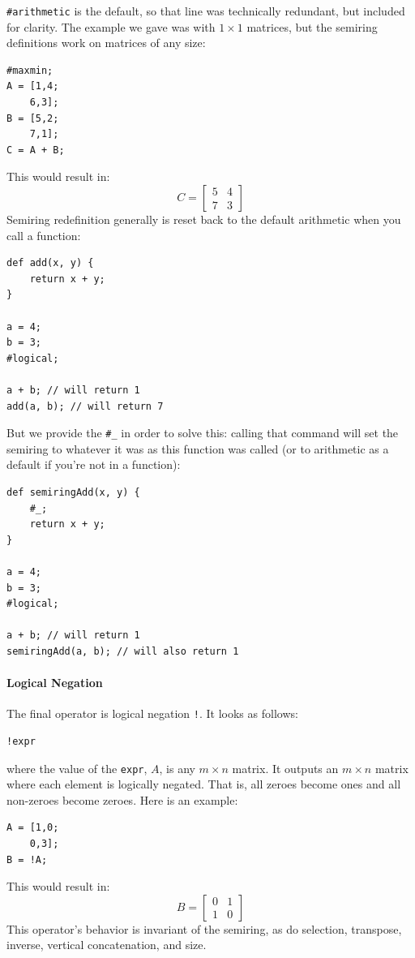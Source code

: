 \verb=#arithmetic= is the default, so that line was technically redundant, but included for clarity.
The example we gave was with $1\times1$ matrices, but the semiring definitions work on matrices of any size:

\begin{lstlisting}
#maxmin;
A = [1,4;
    6,3];
B = [5,2;
    7,1];
C = A + B;
\end{lstlisting}
This would result in:
$$C=\begin{bmatrix}
5&4\\
7&3
\end{bmatrix}$$
Semiring redefinition generally is reset back to the default arithmetic when you call a function:
\begin{lstlisting}
def add(x, y) {
    return x + y;
}

a = 4;
b = 3;
#logical;

a + b; // will return 1
add(a, b); // will return 7
\end{lstlisting}
But we provide the \verb=#_= in order to solve this: calling that command will set the semiring to whatever it was as this function was called (or to arithmetic as a default if you're not in a function):
\begin{lstlisting}
def semiringAdd(x, y) {
    #_;
    return x + y;
}

a = 4;
b = 3;
#logical;

a + b; // will return 1
semiringAdd(a, b); // will also return 1
\end{lstlisting}

\paragraph{Logical Negation}
The final operator is logical negation \verb=!=.  It looks as follows:
\begin{lstlisting}
!expr
\end{lstlisting}
where the value of the \verb=expr=, $A$, is any $m \times n$ matrix.  It outputs an $m \times n$ matrix where each element is logically negated.  That is, all zeroes become ones and all non-zeroes become zeroes.  Here is an example:

\begin{lstlisting}
A = [1,0;
    0,3];
B = !A;
\end{lstlisting}
This would result in:
$$B=\begin{bmatrix}
0 & 1\\
1 & 0
\end{bmatrix}$$
This operator's behavior is invariant of the semiring, as do selection, transpose, inverse, vertical concatenation, and size.


